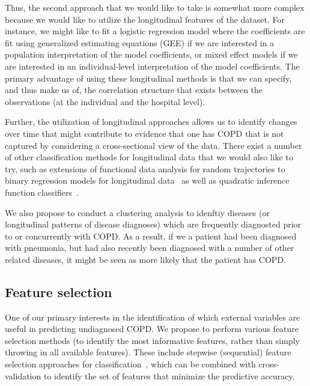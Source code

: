 \documentclass{article}
\begin{document}
Thus, the second approach that we would like to take is somewhat more complex because we would like to utilize the longitudinal features of the dataset. For instance, we might like to fit a logistic regression model where the coefficients are fit using generalized estimating equations (GEE) if we are interested in a population interpretation of the model coefficients, or mixed effect models if we are interested in an individual-level interpretation of the model coefficients. The primary advantage of using these longitudinal methods is that we can specify, and thus make us of, the correlation structure that exists between the observations (at the individual and the hospital level).

Further, the utilization of longitudinal approaches allows us to identify changes over time that might contribute to evidence that one has COPD that is not captured by considering a cross-sectional view of the data. There exist a number of other classification methods for longitudinal data that we would also like to try, such as extensions of functional data analysis for random trajectories to binary regression models for longitudinal data~\cite{muller_functional_2005} as well as quadratic inference function classifiers~\cite{wang_efficient_2014}.

We also propose to conduct a clustering analysis to idenftiy diseases (or longitudinal patterns of disease diagnoses) which are frequently diagnosted prior to or concurrently with COPD. As a result, if we a patient had been diagnosed with pneumonia, but had also recently been diagnosed with a number of other related diseases, it might be seen as more likely that the patient has COPD.


\subsection{Feature selection}

One of our primary interests in the identification of which external variables are useful in predicting undiagnosed COPD. We propose to perform various feature selection methods (to identify the most informative features, rather than simply throwing in all available features). These include stepwise (sequential) feature selection approaches for classification~\cite{zhou_streamwise_2006}, which can be combined with cross-validation to identify the set of features that minimize the predictive accuracy.
\end{document}

